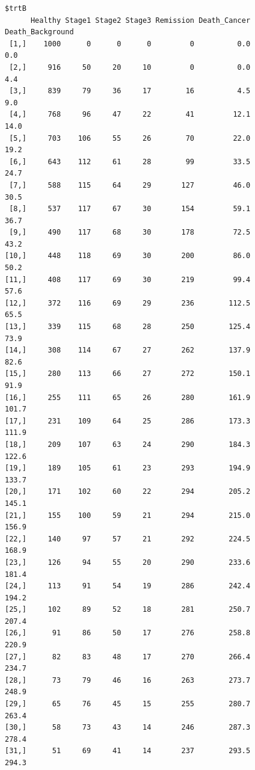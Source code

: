 \documentclass[
  letterpaper,
  DIV=11,
  numbers=noendperiod]{scrartcl}
\begin{document}
\begin{verbatim}
$trtB
      Healthy Stage1 Stage2 Stage3 Remission Death_Cancer Death_Background
 [1,]    1000      0      0      0         0          0.0              0.0
 [2,]     916     50     20     10         0          0.0              4.4
 [3,]     839     79     36     17        16          4.5              9.0
 [4,]     768     96     47     22        41         12.1             14.0
 [5,]     703    106     55     26        70         22.0             19.2
 [6,]     643    112     61     28        99         33.5             24.7
 [7,]     588    115     64     29       127         46.0             30.5
 [8,]     537    117     67     30       154         59.1             36.7
 [9,]     490    117     68     30       178         72.5             43.2
[10,]     448    118     69     30       200         86.0             50.2
[11,]     408    117     69     30       219         99.4             57.6
[12,]     372    116     69     29       236        112.5             65.5
[13,]     339    115     68     28       250        125.4             73.9
[14,]     308    114     67     27       262        137.9             82.6
[15,]     280    113     66     27       272        150.1             91.9
[16,]     255    111     65     26       280        161.9            101.7
[17,]     231    109     64     25       286        173.3            111.9
[18,]     209    107     63     24       290        184.3            122.6
[19,]     189    105     61     23       293        194.9            133.7
[20,]     171    102     60     22       294        205.2            145.1
[21,]     155    100     59     21       294        215.0            156.9
[22,]     140     97     57     21       292        224.5            168.9
[23,]     126     94     55     20       290        233.6            181.4
[24,]     113     91     54     19       286        242.4            194.2
[25,]     102     89     52     18       281        250.7            207.4
[26,]      91     86     50     17       276        258.8            220.9
[27,]      82     83     48     17       270        266.4            234.7
[28,]      73     79     46     16       263        273.7            248.9
[29,]      65     76     45     15       255        280.7            263.4
[30,]      58     73     43     14       246        287.3            278.4
[31,]      51     69     41     14       237        293.5            294.3


\end{verbatim}
\end{document}
